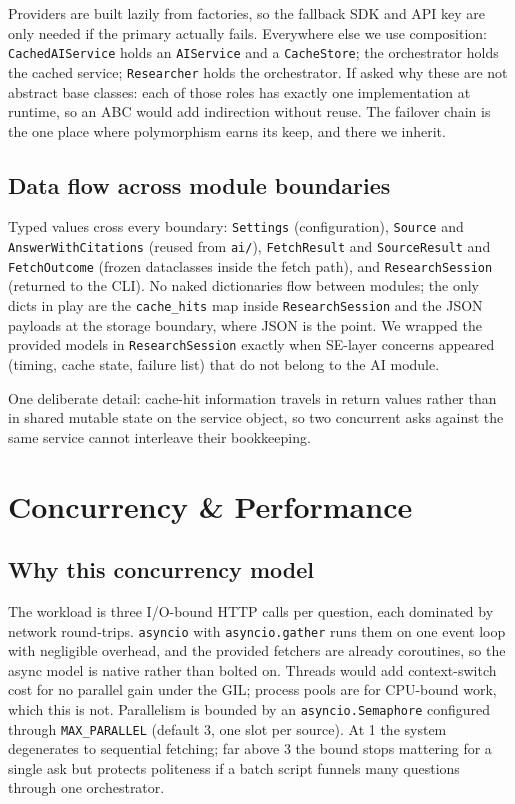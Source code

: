 \documentclass[11pt,a4paper]{article}
\begin{document}
Providers are built lazily from factories, so the fallback SDK and API key are only needed if the primary actually fails. Everywhere else we use composition: \texttt{CachedAIService} holds an \texttt{AIService} and a \texttt{CacheStore}; the orchestrator holds the cached service; \texttt{Researcher} holds the orchestrator. If asked why these are not abstract base classes: each of those roles has exactly one implementation at runtime, so an ABC would add indirection without reuse. The failover chain is the one place where polymorphism earns its keep, and there we inherit.

\subsection{Data flow across module boundaries}

Typed values cross every boundary: \texttt{Settings} (configuration), \texttt{Source} and \texttt{AnswerWithCitations} (reused from \texttt{ai/}), \texttt{FetchResult} and \texttt{SourceResult} and \texttt{FetchOutcome} (frozen dataclasses inside the fetch path), and \texttt{ResearchSession} (returned to the CLI). No naked dictionaries flow between modules; the only dicts in play are the \texttt{cache\_hits} map inside \texttt{ResearchSession} and the JSON payloads at the storage boundary, where JSON is the point. We wrapped the provided models in \texttt{ResearchSession} exactly when SE-layer concerns appeared (timing, cache state, failure list) that do not belong to the AI module.

One deliberate detail: cache-hit information travels in return values rather than in shared mutable state on the service object, so two concurrent asks against the same service cannot interleave their bookkeeping.

\section{Concurrency \& Performance}\label{sec:concurrency}

\subsection{Why this concurrency model}

The workload is three I/O-bound HTTP calls per question, each dominated by network round-trips. \texttt{asyncio} with \texttt{asyncio.gather} runs them on one event loop with negligible overhead, and the provided fetchers are already coroutines, so the async model is native rather than bolted on. Threads would add context-switch cost for no parallel gain under the GIL; process pools are for CPU-bound work, which this is not. Parallelism is bounded by an \texttt{asyncio.Semaphore} configured through \texttt{MAX\_PARALLEL} (default 3, one slot per source). At 1 the system degenerates to sequential fetching; far above 3 the bound stops mattering for a single ask but protects politeness if a batch script funnels many questions through one orchestrator.
\end{document}
